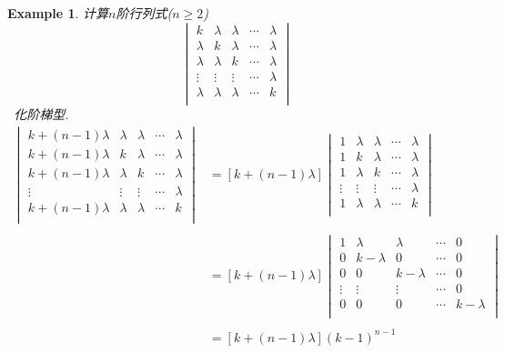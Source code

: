 \documentclass{article}
\newtheorem{example}[theorem]{Example}
\newcommand{\hints}{{\color{blue} \text{hints}}}
\begin{document}
\newpage
\begin{example}
\rm 计算$n$阶行列式($n \geq 2$)
$$
\begin{vmatrix}
k & \lambda & \lambda & \cdots & \lambda \\
\lambda & k & \lambda & \cdots & \lambda \\
\lambda & \lambda & k & \cdots & \lambda \\
\vdots & \vdots & \vdots & \cdots & \lambda \\
\lambda & \lambda & \lambda & \cdots & k \\
\end{vmatrix}
$$
\hints\ 化阶梯型.
$$
\begin{array}{ll}
\begin{vmatrix}
k + (n-1)\lambda & \lambda & \lambda & \cdots & \lambda \\
k + (n-1)\lambda & k & \lambda & \cdots & \lambda \\
k + (n-1)\lambda & \lambda & k & \cdots & \lambda \\
\vdots & \vdots & \vdots & \cdots & \lambda \\
k + (n-1)\lambda & \lambda & \lambda & \cdots & k \\
\end{vmatrix} &= 
\left[ k + (n-1)\lambda \right]
\begin{vmatrix}
1 & \lambda & \lambda & \cdots & \lambda \\
1 & k & \lambda & \cdots & \lambda \\
1 & \lambda & k & \cdots & \lambda \\
\vdots & \vdots & \vdots & \cdots & \lambda \\
1 & \lambda & \lambda & \cdots & k \\
\end{vmatrix} \\ \\
& = 
\left[ k + (n-1)\lambda \right]
\begin{vmatrix}
1 & \lambda & \lambda & \cdots & 0 \\
0 & k-\lambda & 0 & \cdots & 0 \\
0 & 0 & k-\lambda & \cdots & 0 \\
\vdots & \vdots & \vdots & \cdots & 0 \\
0 & 0 & 0 & \cdots & k-\lambda \\ 
\end{vmatrix} \\ \\
& = \left[ k + (n-1)\lambda \right](k-1)^{n-1}
\end{array}
$$
\end{example}
\end{document}
